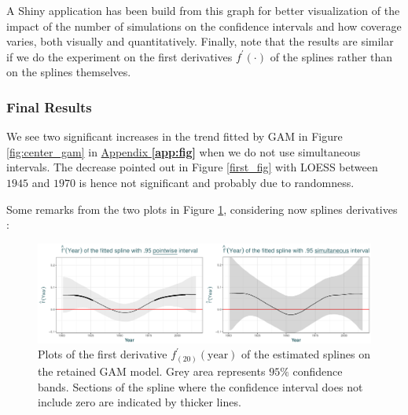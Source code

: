 A Shiny application has been build from this graph for better visualization of the impact of the number of simulations on the confidence intervals and how coverage varies, both visually and quantitatively.
Finally, note that the results are similar if we do the experiment on the first derivatives $f^{'}(\cdot)$ of the splines rather than on the splines themselves.


\subsubsection*{Final Results}

We see two significant increases in the trend fitted by GAM in Figure \ref{fig:center_gam} in \hyperref[app:fig]{Appendix \textbf{\ref{app:fig}}} when we do not use  simultaneous intervals. The decrease pointed out in Figure \ref{first_fig} with LOESS between $1945$ and $1970$ is hence not significant and probably due to randomness.

Some remarks from the two plots in Figure \ref{fig:derivsplines}, considering now splines derivatives :

\begin{figure}[!htb]
	\includegraphics[width=.99\linewidth]{splines.pdf}\caption{Plots of the first derivative $f_{(20)}^{'}(\text{year})$ of the estimated splines on the retained GAM model. Grey area represents $95\%$ confidence bands. Sections of the spline where the confidence interval does not include zero are indicated by thicker lines. }\label{fig:derivsplines}
\end{figure}

